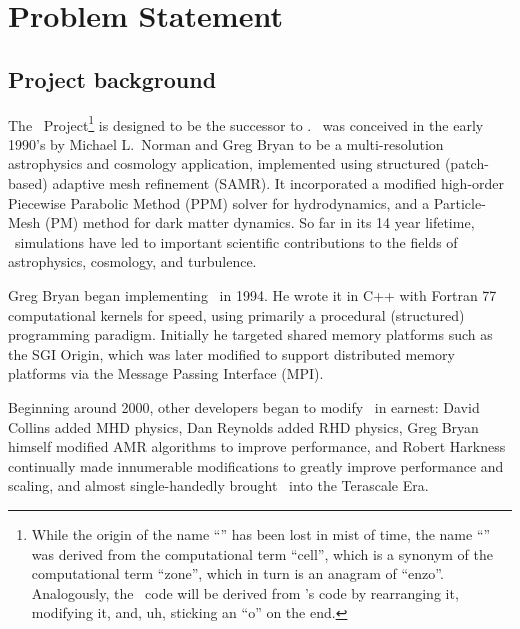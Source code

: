 \documentclass[11pt]{article}
\begin{document}

\section{Problem Statement}

\subsection{Project background}


    The \cello\ Project\footnote{While the origin of the name
    ``\enzo'' has been lost in mist of time, the name ``\cello'' was
    derived from the computational term ``cell'', which is a synonym
    of the computational term ``zone'', which in turn is an anagram of
    ``enzo''.  Analogously, the \cello\ code will be derived from
    \enzo's code by rearranging it, modifying it, and, uh, sticking an
    ``o'' on the end.}  is designed to be the successor to \enzo.
    \enzo\ was conceived in the early 1990's by Michael L.~Norman and
    Greg Bryan to be a multi-resolution astrophysics and cosmology
    application, implemented using structured (patch-based) adaptive
    mesh refinement (SAMR).  It incorporated a modified high-order
    Piecewise Parabolic Method (PPM) solver for hydrodynamics, and a
    Particle-Mesh (PM) method for dark matter dynamics.  So far in its
    14 year lifetime, \enzo\ simulations have led to important
    scientific contributions to the fields of astrophysics, cosmology,
    and turbulence.

    Greg Bryan began implementing \enzo\ in 1994.  He wrote it in C++
    with Fortran 77 computational kernels for speed, using primarily a
    procedural (structured) programming paradigm.  Initially he
    targeted shared memory platforms such as the SGI Origin, which was
    later modified to support distributed memory platforms via the
    Message Passing Interface (MPI).

    Beginning around 2000, other developers began to modify \enzo\ in
    earnest: David Collins added MHD physics, Dan Reynolds added
    RHD physics, Greg Bryan himself modified AMR algorithms to improve
    performance, and Robert Harkness continually made innumerable
    modifications to greatly improve performance and scaling, and
    almost single-handedly brought \enzo\ into the Terascale Era.
\end{document}
